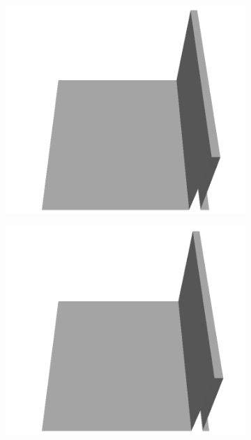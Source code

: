 \documentclass[../document.tex]{subfiles}
\begin{document}
\begin{figure}[H]
\begin{subfigure}[b]{0.065\textwidth}
    \includegraphics[width=\linewidth]{../img/5/custom_patches/walls_front/all/09-3d.png}
    \end{subfigure}
    \begin{subfigure}[b]{0.065\textwidth}
    \includegraphics[width=\linewidth]{../img/5/custom_patches/walls_front/all/08-3d.png}
    \end{subfigure}
    \begin{subfigure}[b]{0.065\textwidth}

\end{subfigure}
\end{figure}
\end{document}
